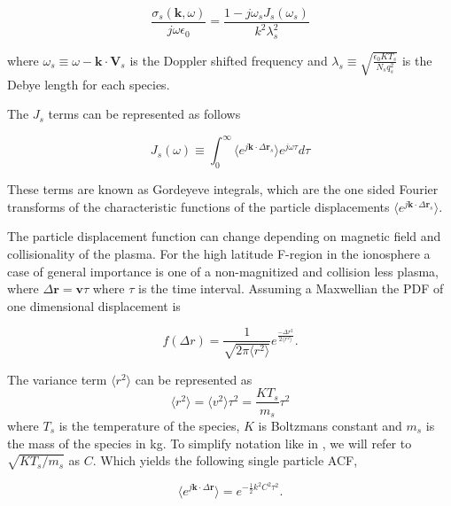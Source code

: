 \documentclass[10pt]{report}
\begin{document}
\begin{equation}
\label{eq:cond}
\frac{\sigma_{s}(\mathbf{k},\omega)}{j\omega\epsilon_0} = \frac{1-j\omega_s J_s(\omega_s)}{k^2\lambda_s^2}
\end{equation}

\noindent where $\omega_s \equiv \omega-\mathbf{k}\cdot\mathbf{V}_s $ is the Doppler shifted frequency and $\lambda_s \equiv \sqrt{\frac{\epsilon_0 KT_s}{N_s q_s^2}}$ is the Debye length for each species.

The $J_s$ terms can be represented as follows

\begin{equation}
\label{eq:gord}
J_s(\omega)\equiv \int_0^\infty \langle e^{j\mathbf{k}\cdot\Delta \mathbf{r}_s}\rangle e^{j\omega\tau}d\tau
\end{equation}

\noindent These terms are known as Gordeyeve integrals, which are the one sided Fourier transforms of the characteristic functions of the particle displacements $\langle e^{j\mathbf{k}\cdot\Delta\mathbf{r}_s}\rangle$.  

The particle displacement function can change depending on magnetic field and collisionality of the plasma. For the high latitude F-region in the ionosphere a case of general importance is one of a non-magnitized and collision less plasma, where $\Delta\mathbf{r} = \mathbf{v}\tau$ where $\tau$ is the time interval. Assuming a Maxwellian the PDF of one dimensional displacement is

\begin{equation}
\label{eq:pdfr}
f(\Delta r) = \frac{1}{\sqrt{2\pi \langle r^2 \rangle}}e^{\frac{-\Delta r^2}{2\langle r^2\rangle}}.
\end{equation}
 
\noindent The variance term $\langle r^2 \rangle$ can be represented as
\begin{equation}
\label{eq:var}
\langle r^2 \rangle = \langle v^2 \rangle \tau^2 = \frac{KT_s}{m_s} \tau^2
\end{equation}
 \noindent where $T_s$ is the temperature of the species, $K$ is Boltzmans constant and $m_s$ is the mass of the species in kg. To simplify notation like in \cite{kudeki:milla:1}, we will refer to $\sqrt{KT_s/m_s}$ as $C$. Which yields the following single particle ACF,
 
 \begin{equation}
\label{eq:pdfall}
\langle e^{j\mathbf{k}\cdot\Delta \mathbf{r}}\rangle= e^{-\frac{1}{2}k^2C^2 \tau^2}.
\end{equation}
 
\end{document}
